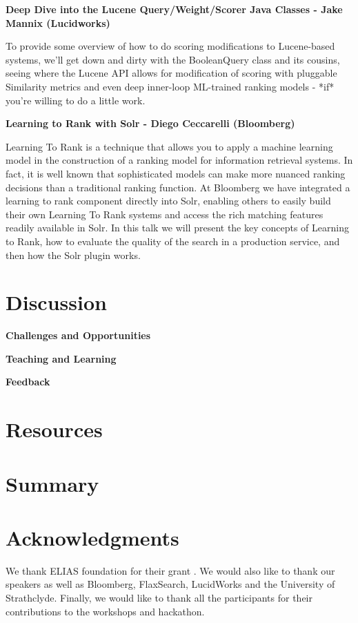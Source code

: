\documentclass[12pt]{article}
\begin{document}
\begin{sloppypar}
{\bf Deep Dive into the Lucene Query/Weight/Scorer Java Classes - Jake Mannix (Lucidworks) }

To provide some overview of how to do scoring modifications to Lucene-based systems, we'll get down and dirty with the BooleanQuery class and its cousins, seeing where the Lucene API allows for modification of scoring with pluggable Similarity metrics and even deep inner-loop ML-trained ranking models - *if* you're willing to do a little work.


{\bf Learning to Rank with Solr - Diego Ceccarelli (Bloomberg)}

Learning To Rank is a technique that allows you to apply a machine learning model in the construction of a ranking model for information retrieval systems. In fact, it is well known that sophisticated models can make more nuanced ranking decisions than a traditional ranking function. At Bloomberg we have integrated a learning to rank component directly into Solr, enabling others to easily build their own Learning To Rank systems and access the rich matching features readily available in Solr. In this talk we will present the key concepts of Learning to Rank, how to evaluate the quality of the search in a production service, and then how the Solr plugin works.


\section{Discussion}

{\bf Challenges and Opportunities}


{\bf Teaching and Learning}


{\bf Feedback}


\section{Resources}

\section{Summary}

\section{Acknowledgments}
We thank ELIAS foundation for their grant . We would also like to thank our speakers as well as Bloomberg, FlaxSearch, LucidWorks and the University of Strathclyde. Finally, we would like to thank all the participants for their contributions to the workshops and hackathon.




\end{sloppypar}
\end{document}
